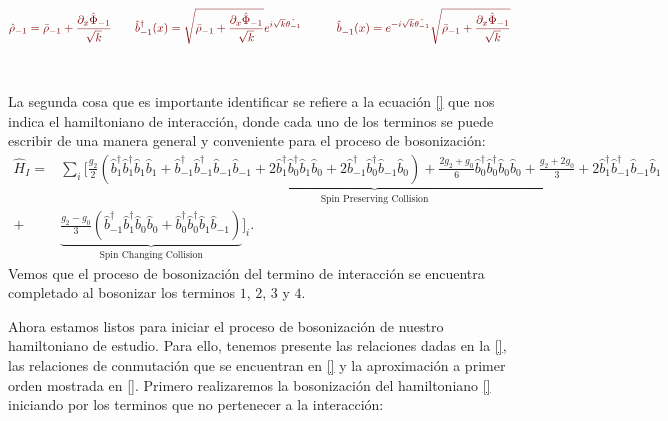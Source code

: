 \footnotesize
\begin{equation}
\begin{aligned}
    \textcolor{myred}{\hat{\rho}_{-1} = \bar{\rho}_{-1} + \frac{\partial_{x} \hat{\Phi}_{-1}}{\sqrt{k}}} \quad \quad &  \textcolor{myred}{\hat{b}_{-1}^{\dagger} (x) = \sqrt{ \bar{\rho}_{-1} + \frac{\partial_{x} \hat{\Phi}_{-1}}{\sqrt{k}}} e^{i \sqrt{k} \hat{\theta_{-1}}}} \quad \quad  & \textcolor{myred}{\hat{b}_{-1}^{} (x) = e^{-i \sqrt{k} \hat{\theta_{-1}}} \sqrt{ \bar{\rho}_{-1} + \frac{\partial_{x} \hat{\Phi}_{-1}}{\sqrt{k}}} } 
\end{aligned}
\end{equation}\\ \\
\normalsize
La segunda cosa que es importante identificar se refiere a la ecuación \eqref{} que nos indica el hamiltoniano de interacción, donde cada uno de los terminos se puede escribir de una manera general y conveniente para el proceso de bosonización:
\footnotesize 
\begin{align}
    \hat{H}_{I} = &\sum_i \Bigg[ \underbrace{\frac{g_2}{2} \left( \hat{b}_{1}^{\dagger}\hat{b}_{1}^{\dagger} \hat{b}_{1}^{} \hat{b}_{1}^{} 
    + \hat{b}_{-1}^{\dagger}\hat{b}_{-1}^{\dagger} \hat{b}_{-1}^{} \hat{b}_{-1}^{} 
    + 2\hat{b}_{1}^{\dagger}\hat{b}_{0}^{\dagger} \hat{b}_{1}^{} \hat{b}_{0}^{}  
    + 2\hat{b}_{-1}^{\dagger}\hat{b}_{0}^{\dagger} \hat{b}_{-1}^{} \hat{b}_{0}^{} \right) 
    + \frac{2g_{2} + g_{0}}{6} \hat{b}_{0}^{\dagger}\hat{b}_{0}^{\dagger} \hat{b}_{0}^{} \hat{b}_{0}^{}+\frac{g_{2} + 2g_{0}}{3} + 2\hat{b}_{1}^{\dagger}\hat{b}_{-1}^{\dagger} \hat{b}_{-1}^{} \hat{b}_{1}^{} }_{\text {Spin Preserving Collision}}  \nonumber \\
 +&\underbrace{\frac{g_{2}-g_{0}}{3} \left( \hat{b}_{-1}^{\dagger}\hat{b}_{1}^{\dagger} \hat{b}_{0}^{} \hat{b}_{0}^{} + \hat{b}_{0}^{\dagger}\hat{b}_{0}^{\dagger} \hat{b}_{1}^{} \hat{b}_{-1}^{}\right)}_{\text {Spin Changing Collision}} 
    \Bigg]_{i}.
\end{align}
\normalsize
Vemos que el proceso de bosonización del termino de interacción se encuentra completado al bosonizar los terminos $ 1$, $2$, $3$ y $4$.

Ahora estamos listos para iniciar el proceso de bosonización de nuestro hamiltoniano de estudio. Para ello, tenemos presente las relaciones dadas  en la \eqref{}, las relaciones de conmutación que se encuentran en \eqref{} y la aproximación a primer orden mostrada en \eqref{}. Primero realizaremos la bosonización del hamiltoniano \eqref{} iniciando por los terminos que no pertenecer a la interacción:
